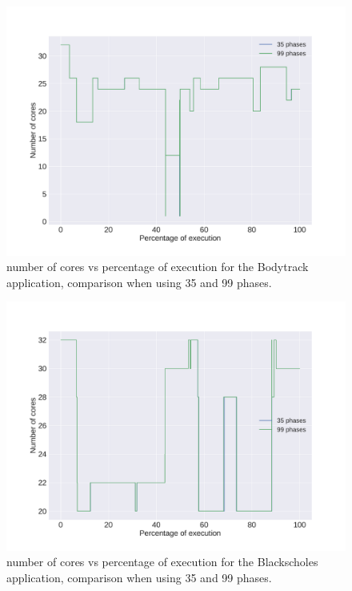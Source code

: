 \begin{figure}[h]
	\centering
	\includegraphics[width=\columnwidth]{phases/figures/signals/completo_bodytrack_1_cores_signals_cmp.pdf}
	\caption{number of cores vs percentage of execution for the Bodytrack application, comparison when using 35 and 99 phases.}
	\label{fig:cores_control_1}
\end{figure}%
\begin{figure}[h]
	\centering
	\includegraphics[width=\columnwidth]{phases/figures/signals/completo_black_1_cores_signals_cmp.pdf}
	\caption{number of cores vs percentage of execution for the Blackscholes application, comparison when using 35 and 99 phases.}
	\label{fig:cores_control_2}
\end{figure}%


